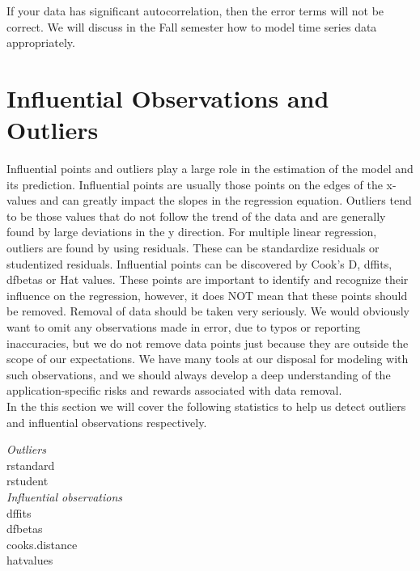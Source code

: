 \documentclass[
  letterpaper,
  DIV=11,
  numbers=noendperiod]{scrreprt}
\begin{document}
If your data has significant autocorrelation, then the error terms will
not be correct. We will discuss in the Fall semester how to model time
series data appropriately.

\hypertarget{influential-observations-and-outliers}{%
\section{Influential Observations and
Outliers}\label{influential-observations-and-outliers}}

Influential points and outliers play a large role in the estimation of
the model and its prediction. Influential points are usually those
points on the edges of the x-values and can greatly impact the slopes in
the regression equation. Outliers tend to be those values that do not
follow the trend of the data and are generally found by large deviations
in the y direction. For multiple linear regression, outliers are found
by using residuals. These can be standardize residuals or studentized
residuals. Influential points can be discovered by Cook's D, dffits,
dfbetas or Hat values. These points are important to identify and
recognize their influence on the regression, however, it does NOT mean
that these points should be removed. Removal of data should be taken
very seriously. We would obviously want to omit any observations made in
error, due to typos or reporting inaccuracies, but we do not remove data
points just because they are outside the scope of our expectations. We
have many tools at our disposal for modeling with such observations, and
we should always develop a deep understanding of the
application-specific risks and rewards associated with data removal.\\

In the this section we will cover the following statistics to help us
detect outliers and influential observations respectively.

\emph{Outliers}\\
rstandard\\
rstudent\\
\emph{Influential observations}\\
dffits\\
dfbetas\\
cooks.distance\\
hatvalues\\
\end{document}
